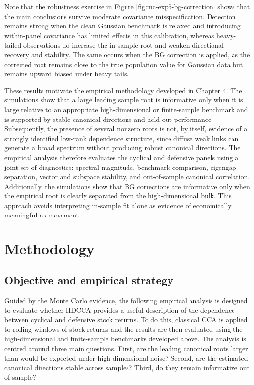 \documentclass[12pt]{report} %
\begin{document}
Note that the robustness exercise in Figure \ref{fig:mc-exp6-bg-correction} shows
that the main conclusions survive moderate covariance misspecification. Detection 
remains strong when the clean Gaussian benchmark is relaxed and introducing 
within-panel covariance has limited effects in this calibration, whereas heavy-tailed 
observations do increase the in-sample root and weaken 
directional recovery and stability. The same occurs when the BG correction is applied, 
as the corrected root remains close to the true population value for Gaussian data but 
remains upward biased under heavy tails.

These results motivate the empirical methodology developed in Chapter 4. The simulations 
show that a large leading sample root is informative only when it is large relative to an 
appropriate high-dimensional or finite-sample benchmark and is supported by stable 
canonical directions and held-out performance. Subsequently, the presence of several 
nonzero roots is not, by itself, evidence of a strongly identified low-rank dependence 
structure, since diffuse weak links can generate a broad spectrum without producing 
robust canonical directions. 
The empirical analysis therefore evaluates the cyclical and defensive panels using a 
joint set of diagnostics: spectral magnitude, benchmark comparison, eigengap separation, 
vector and subspace stability, and out-of-sample canonical correlation. 
Additionally, the simulations show that BG corrections are informative 
only when the empirical root is clearly separated from the high-dimensional bulk.
This approach avoids interpreting in-sample fit alone as evidence of economically meaningful co-movement.

\chapter{Methodology}
\label{ch:Methodology}

\section{Objective and empirical strategy}

Guided by the Monte Carlo evidence, the following empirical analysis is designed to evaluate
whether HDCCA provides a useful description of the dependence between cyclical and defensive stock returns.
To do this, classical CCA is applied to rolling windows of stock returns and the results are then evaluated 
using the high-dimensional and finite-sample benchmarks developed above. The analysis is centred
around three main questions. First, are the leading canonical roots larger than would be expected 
under high-dimensional noise? Second, are the estimated canonical directions stable across samples? 
Third, do they remain informative out of sample?
\end{document}
